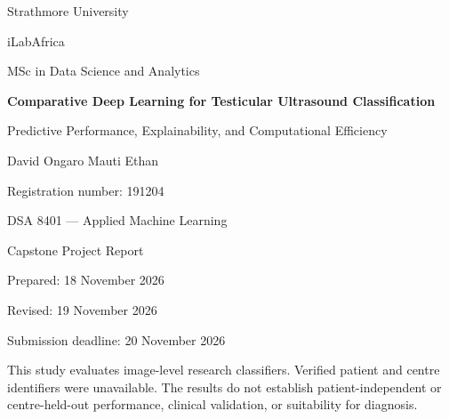 \documentclass[11pt,a4paper]{article}
\begin{document}
\begin{titlepage}
\centering
{\Large Strathmore University\par}
\vspace{4mm}
{\large iLabAfrica\par}
{\large MSc in Data Science and Analytics\par}
\vspace{20mm}
{\color{ink}\LARGE\bfseries Comparative Deep Learning for Testicular Ultrasound Classification\par}
\vspace{6mm}
{\Large Predictive Performance, Explainability, and Computational Efficiency\par}
\vspace{20mm}
{\large David Ongaro Mauti Ethan\par}
\vspace{3mm}
{\large Registration number: 191204\par}
\vspace{15mm}
{\large DSA 8401 --- Applied Machine Learning\par}
{\large Capstone Project Report\par}
\vfill
{Prepared: 18 November 2026\par}
{Revised: 19 November 2026\par}
{Submission deadline: 20 November 2026\par}
\vspace{10mm}
\begin{minipage}{0.84\textwidth}
\small This study evaluates image-level research classifiers. Verified patient and centre identifiers were unavailable. The results do not establish patient-independent or centre-held-out performance, clinical validation, or suitability for diagnosis.
\end{minipage}
\end{titlepage}
\end{document}
